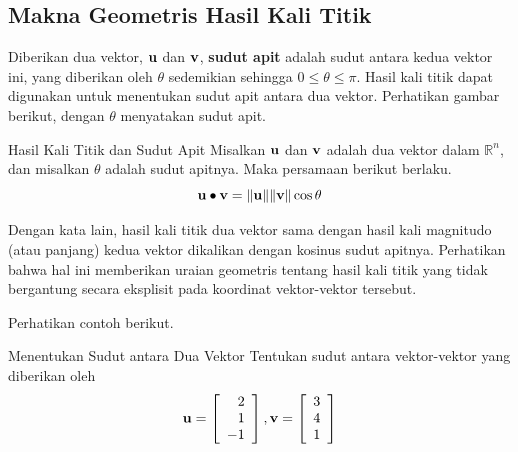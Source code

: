 \subsection{Makna Geometris Hasil Kali Titik}

Diberikan dua vektor, $\mathbf{u}$ dan $\mathbf{v}$, \textbf{sudut apit}
adalah sudut antara kedua vektor ini, yang
diberikan oleh $\theta$ sedemikian sehingga $0 \leq \theta \leq \pi$. Hasil kali titik dapat digunakan untuk
menentukan sudut apit antara dua vektor. Perhatikan gambar berikut, dengan $\theta$ menyatakan sudut apit.

\begin{center}
\par{}\label{fig:RnVectorsDotProductSignificance-tikz01}%

\end{center}

\begin{proposition}{Hasil Kali Titik dan Sudut Apit}\label{prop:dotproductangle}
Misalkan $\mathbf{u}$ dan $\mathbf{v}$ adalah dua vektor dalam $\mathbb{R}^n$, dan misalkan
$\theta$ adalah sudut apitnya. Maka persamaan berikut berlaku.
\begin{equation*}
\mathbf{u}\bullet \mathbf{v}=\| \mathbf{u}\| \| \mathbf{v}
\| \cos \theta
\end{equation*}
\end{proposition}

Dengan kata lain, hasil kali titik dua vektor sama dengan hasil kali
magnitudo (atau panjang) kedua vektor dikalikan dengan kosinus sudut
apitnya. Perhatikan bahwa hal ini memberikan uraian geometris tentang hasil kali titik yang tidak
bergantung secara eksplisit pada koordinat vektor-vektor tersebut.

Perhatikan contoh berikut.

\begin{example}{Menentukan Sudut antara Dua Vektor}\label{exa:angletwovectors}
Tentukan sudut antara vektor-vektor yang diberikan oleh
\begin{equation*}
\mathbf{u}
=
\left[
\begin{array}{r}
2 \\
1 \\
-1
\end{array}
\right],
\mathbf{v}
=
\left[
\begin{array}{r}
3 \\
4 \\
1
\end{array}
\right]
\end{equation*}
\end{example}

